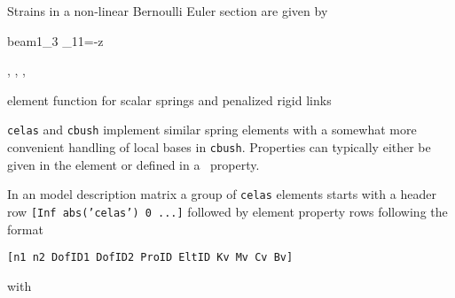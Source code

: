 Strains in a non-linear Bernoulli Euler section are given by 

\begin{eqsvg}{beam1_3}
\epsilon_{11}=-z
\end{eqsvg}
%



\noindent \pbeam, \melastic, \femk, \feplot 


\noindent element function for scalar springs and penalized rigid links


{\tt celas} and {\tt cbush} implement similar spring elements with a somewhat more convenient handling of local bases in {\tt cbush}. Properties can typically either be given in the element or defined in a \pspring\ property. 


\noindent In an model description matrix a group of {\tt celas} elements starts with a header row {\tt [Inf  abs('celas') 0 ...]} followed by element property rows following the format

{\tt [n1 n2 DofID1 DofID2 ProID EltID Kv Mv Cv Bv]}

with

